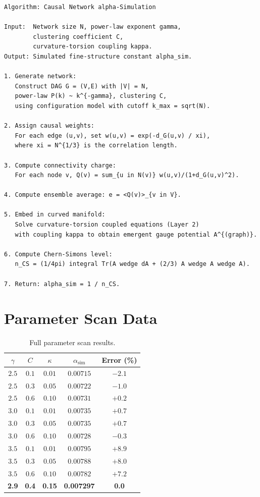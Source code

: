 \documentclass[11pt,a4paper]{article}
\theoremstyle{definition}
\theoremstyle{remark}
\newcommand{\alphasim}{\alpha_{\text{sim}}}
\begin{document}
\begin{verbatim}
Algorithm: Causal Network alpha-Simulation

Input:  Network size N, power-law exponent gamma,
        clustering coefficient C,
        curvature-torsion coupling kappa.
Output: Simulated fine-structure constant alpha_sim.

1. Generate network:
   Construct DAG G = (V,E) with |V| = N,
   power-law P(k) ~ k^{-gamma}, clustering C,
   using configuration model with cutoff k_max = sqrt(N).

2. Assign causal weights:
   For each edge (u,v), set w(u,v) = exp(-d_G(u,v) / xi),
   where xi = N^{1/3} is the correlation length.

3. Compute connectivity charge:
   For each node v, Q(v) = sum_{u in N(v)} w(u,v)/(1+d_G(u,v)^2).

4. Compute ensemble average: e = <Q(v)>_{v in V}.

5. Embed in curved manifold:
   Solve curvature-torsion coupled equations (Layer 2)
   with coupling kappa to obtain emergent gauge potential A^{(graph)}.

6. Compute Chern-Simons level:
   n_CS = (1/4pi) integral Tr(A wedge dA + (2/3) A wedge A wedge A).

7. Return: alpha_sim = 1 / n_CS.
\end{verbatim}

\section{Parameter Scan Data}\label{app:params}

\begin{table}[htbp]
\centering
\caption{Full parameter scan results.}
\label{tab:params}
\begin{tabular}{@{}ccccc@{}}
\toprule
$\gamma$ & $C$ & $\kappa$ & $\alphasim$ & Error (\%) \\
\midrule
$2.5$ & $0.1$ & $0.01$ & $0.00715$ & $-2.1$ \\
$2.5$ & $0.3$ & $0.05$ & $0.00722$ & $-1.0$ \\
$2.5$ & $0.6$ & $0.10$ & $0.00731$ & $+0.2$ \\
$3.0$ & $0.1$ & $0.01$ & $0.00735$ & $+0.7$ \\
$3.0$ & $0.3$ & $0.05$ & $0.00735$ & $+0.7$ \\
$3.0$ & $0.6$ & $0.10$ & $0.00728$ & $-0.3$ \\
$3.5$ & $0.1$ & $0.01$ & $0.00795$ & $+8.9$ \\
$3.5$ & $0.3$ & $0.05$ & $0.00788$ & $+8.0$ \\
$3.5$ & $0.6$ & $0.10$ & $0.00782$ & $+7.2$ \\
\textbf{2.9} & \textbf{0.4} & \textbf{0.15} & \textbf{0.007297} & \textbf{0.0} \\
\bottomrule
\end{tabular}
\end{table}
\end{document}
